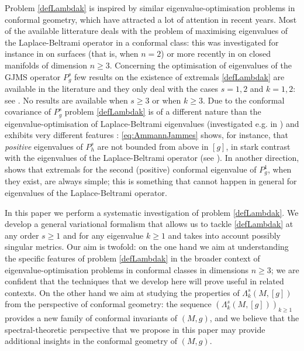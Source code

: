 \documentclass[10pt]{amsart}
\numberwithin{equation}{section}
\theoremstyle{plain}
\theoremstyle{remark}
\begin{document}
Problem \eqref{defLambdak} is inspired by similar eigenvalue-optimisation problems in conformal geometry, which have attracted a lot of attention in recent years. Most of the available litterature deals with the problem of maximising eigenvalues of the Laplace-Beltrami operator in a conformal class: this was investigated for instance in \cites{Petrides3, Petrides2, Petrides4, NadirashviliSire1, NadirashviliSire2, KNPP, KSminmax} on surfaces (that is, when $n=2$) or more recently in \cite{KS22,Petrides6} on closed manifolds of dimension $n \ge 3$. Concerning the optimisation of eigenvalues of the GJMS operator $P_g^s$ few results on the existence of extremals \eqref{defLambdak} are available in the literature and they only deal with the cases $s=1,2$ and  $k=1,2$: see \cite{AmmannHumbert, BenBou, ElSayed, GurskyPerez, PremoselliVetois3}. No results are available when $s \ge 3$ or when $k \ge 3$. Due to the conformal covariance of $P_g^s$ problem \eqref{defLambdak} is of a different nature than the eigenvalue-optimisation of Laplace-Beltrami eigenvalues (investigated e.g. in \cite{KS22,Petrides6}) and exhibits very different features : \eqref{eq:AmmannJammes} shows, for instance, that \emph{positive} eigenvalues of $P_h^s$ are not bounded from above in $[g]$, in stark contrast with the eigenvalues of the Laplace-Beltrami operator (see \cite{YangYau, LiYau, korevaar, HASSANNEZHAD, ColboisElSoufi, ElSoufiIlias}). In another direction, \cite{AmmannHumbert} shows that extremals for the second (positive) conformal eigenvalue of $P_g^1$, when they exist, are always simple; this is something that cannot happen in general for eigenvalues of the Laplace-Beltrami operator.

\medskip

 In this paper we perform a systematic investigation of problem \eqref{defLambdak}. We develop a general variational formalism that allows us to tackle \eqref{defLambdak} at any order $s \ge 1$ and for any eigenvalue $k \ge 1$ and takes into account possibly singular metrics. Our aim is twofold: on the one hand we aim at understanding the specific features of problem \eqref{defLambdak} in the broader context of eigenvalue-optimisation problems in conformal classes in dimensions $n \ge 3$; we are confident that the techniques that we develop here will prove useful in related contexts. On the other hand we aim at studying the properties of $\Lambda_k^s(M,[g])$ from the perspective of conformal geometry: the sequence $(\Lambda_k^s(M,[g]))_{k \ge1}$ provides a new family of conformal invariants of $(M,g)$, and we believe that the spectral-theoretic perspective that we propose in this paper may provide additional insights in the conformal geometry of $(M,g)$. 
 
\end{document}
